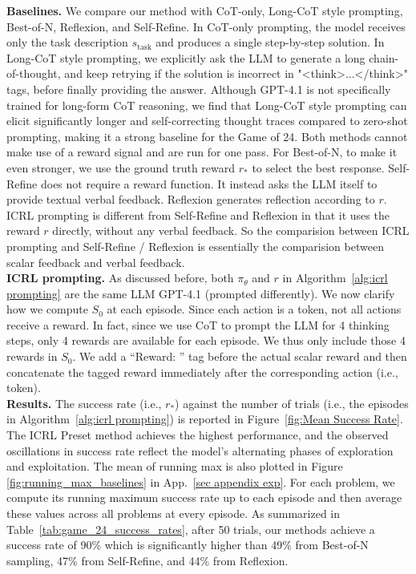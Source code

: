 \documentclass{article}
\newcommand{\0}{\mathbf{0}}
\begin{document}
\textbf{Baselines.} We compare our method with CoT-only, Long-CoT style prompting, Best-of-N, Reflexion, and Self-Refine. In CoT-only prompting, the model receives only the task description $s_{\text{task}}$ and produces a single step-by-step solution. In Long-CoT style prompting, we explicitly ask the LLM to generate a long chain-of-thought, and keep retrying if the solution is incorrect in "<think>...</think>" tags, before finally providing the answer.  Although GPT-4.1 is not specifically trained for long-form CoT reasoning, we find that Long-CoT style prompting can elicit significantly longer and self-correcting thought traces compared to zero-shot prompting, making it a strong baseline for the Game of 24.
Both methods cannot make use of a reward signal and are run for one pass.
For Best-of-N, to make it even stronger,
we use the ground truth reward $r_*$ to select the best response.
Self-Refine does not require a reward function.
It instead asks the LLM itself to provide textual verbal feedback.
Reflexion generates reflection according to $r$.
ICRL prompting is different from Self-Refine and Reflexion in that it uses the reward $r$ directly,
without any verbal feedback.
So the comparision between ICRL prompting and Self-Refine / Reflexion is essentially the comparision between scalar feedback and verbal feedback. \\
\textbf{ICRL prompting.}
As discussed before, both $\pi_\theta$ and $r$ in Algorithm~\ref{alg:icrl prompting} are the same LLM GPT-4.1 (prompted differently).
We now clarify how we compute $S_0$ at each episode.
Since each action is a token,
not all actions receive a reward.
In fact,
since we use CoT to prompt the LLM for 4 thinking steps,
only 4 rewards are available for each episode.
We thus only include those 4 rewards in $S_0$.
We add a ``Reward: '' tag before the actual scalar reward and then concatenate the tagged reward immediately after the corresponding action (i.e., token). \\
\textbf{Results.}
The success rate (i.e., $r_*$) against the number of trials (i.e., the episodes in Algorithm~\ref{alg:icrl prompting}) is reported in Figure~\ref{fig:Mean Success Rate}. The ICRL Preset method achieves the highest performance, and the observed oscillations in success rate reflect the model's alternating phases of exploration and exploitation. The mean of running max is also plotted in Figure \ref{fig:running_max_baselines} in App.~\ref{sec appendix exp}. For each problem, we compute its running maximum success rate up to each episode and then average these values across all problems at every episode.
As summarized in Table~\ref{tab:game_24_success_rates},
after 50 trials,
our methods
achieve a success rate of 90\% which is significantly higher than 49\% from Best-of-N sampling, 47\% from Self-Refine, and 44\% from Reflexion.
\end{document}
